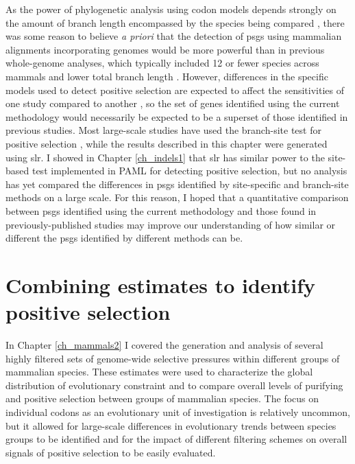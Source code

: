 As the power of phylogenetic analysis using codon models depends
strongly on the amount of branch length encompassed by the species
being compared \citep{Anisimova2001,Anisimova2002}, there was some
reason to believe \emph{a priori} that the detection of \acp{psg}
using mammalian alignments incorporating \lcv genomes would be more
powerful than in previous whole-genome analyses, which typically
included 12 or fewer species across mammals and lower total branch
length \citep{ELLEGREN2008k}. However, differences in the specific
models used to detect positive selection are expected to affect the
sensitivities of one study compared to another \citep{Anisimova2009},
so the set of genes identified using the current methodology would
necessarily be expected to be a superset of those identified in
previous studies. Most large-scale studies have used the branch-site
test for positive selection \citep{Zhang2005}, while the results
described in this chapter were generated using \ac{slr}. I showed in
Chapter \ref{ch_indels1} that \ac{slr} has similar power to the
site-based test implemented in PAML for detecting \sw positive
selection, but no analysis has yet compared the differences in
\acp{psg} identified by site-specific and branch-site methods on a
large scale. For this reason, I hoped that a quantitative comparison
between \acp{psg} identified using the current methodology and those
found in previously-published studies may improve our understanding of
how similar or different the \acp{psg} identified by different methods
can be.

\section{Combining \sw estimates to identify positive selection}

In Chapter \ref{ch_mammals2} I covered the generation and analysis of
several highly filtered sets of genome-wide \sw selective pressures
within different groups of mammalian species. These \sw estimates were
used to characterize the global distribution of evolutionary
constraint and to compare overall levels of purifying and positive
selection between groups of mammalian species. The focus on individual
codons as an evolutionary unit of investigation is relatively
uncommon, but it allowed for large-scale differences in evolutionary
trends between species groups to be identified and for the impact of
different filtering schemes on overall signals of positive selection
to be easily evaluated.

